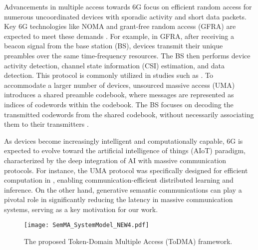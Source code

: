 Advancements in multiple access towards 6G focus on efficient random access for numerous uncoordinated devices with sporadic activity and short data packets. Key 6G technologies like NOMA and grant-free random access (GFRA) are expected to meet these demands \cite{ding2024next,liva2024unsourced}. For example, in GFRA, after receiving a beacon signal from the base station (BS), devices transmit their unique preambles over the same time-frequency resources. The BS then performs device activity detection, channel state information (CSI) estimation, and data detection. This protocol is commonly utilized in studies such as \cite{Liuliang, qiao2023sensing, wang2024covariance}.
To accommodate a larger number of devices, unsourced massive access (UMA) introduces a shared preamble codebook, where messages are represented as indices of codewords within the codebook. The BS focuses on decoding the transmitted codewords from the shared codebook, without necessarily associating them to their transmitters \cite{polyanskiy2017perspective, shyianov2020massive, tian2024design}. 

As devices become increasingly intelligent and computationally capable, 6G is expected to evolve toward the artificial intelligence of things (AIoT) paradigm, characterized by the deep integration of AI with massive communication protocols. For instance, the UMA protocol was specifically designed for efficient computation in \cite{qiao2024massive}, enabling communication-efficient distributed learning and inference. On the other hand, generative semantic communications can play a pivotal role in significantly reducing the latency in massive communication systems, serving as a key motivation for our work.

\begin{figure*}[t]
     \centering
     \texttt{[image: SemMA\_SystemModel\_NEW4.pdf]}
     \caption{The proposed Token-Domain Multiple Access (ToDMA) framework.}
     \label{fig2}
     \vspace{-5mm}
\end{figure*}